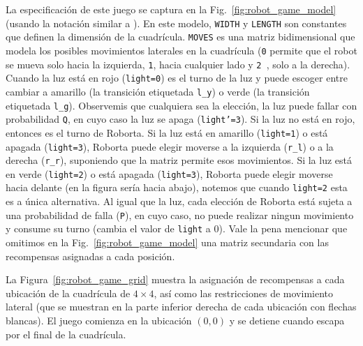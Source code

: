 La especificación de este juego se captura en la Fig.~\ref{fig:robot_game_model} (usando la notación similar a {\Prism} \cite{DBLP:conf/cav/KwiatkowskaNP11}).
En este modelo, \texttt{WIDTH} y \texttt{LENGTH} son constantes que definen la dimensión de la cuadrícula. \texttt{MOVES} es una matriz bidimensional que modela los posibles movimientos laterales en la cuadrícula (\texttt{0} permite que el robot se mueva solo hacia la izquierda, \texttt{1}, hacia cualquier lado y \texttt{2 }, solo a la derecha). Cuando la luz está en rojo (\texttt{light=0}) es el turno de la luz y puede escoger entre cambiar a amarillo (la transición etiquetada \texttt{l\_y}) o verde (la transición etiquetada \texttt{l\_g}). Observemis que cualquiera sea la elección, la luz puede fallar con probabilidad \texttt{Q}, en cuyo caso la luz se apaga (\texttt{light’=3}). Si la luz no está en rojo, entonces es el turno de Roborta. Si la luz está en amarillo (\texttt{light=1}) o está apagada (\texttt{light=3}), Roborta puede elegir moverse a la izquierda (\texttt{r\_l}) o a la derecha (\texttt{r\_r}), suponiendo que la matriz permite esos movimientos. Si la luz está en verde (\texttt{light=2}) o está apagada (\texttt{light=3}), Roborta puede elegir moverse hacia delante (en la figura sería hacia abajo), notemos que cuando \texttt{light=2} esta es a única alternativa. Al igual que la luz, cada elección de Roborta está sujeta a una probabilidad de falla (\texttt{P}), en cuyo caso, no puede realizar ningun movimiento y consume su turno (cambia el valor de \texttt{light} a 0). Vale la pena mencionar que omitimos en la Fig.~\ref{fig:robot_game_model} una matriz secundaria con las recompensas asignadas a cada posición.

La Figura~\ref{fig:robot_game_grid} muestra la asignación de recompensas a cada ubicación de la cuadrícula de $4 \times 4$, así como las restricciones de movimiento lateral (que se muestran en la parte inferior derecha de cada ubicación con flechas blancas).
El juego comienza en la ubicación $(0, 0)$ y se detiene cuando \roborta escapa por el final de la cuadrícula.


